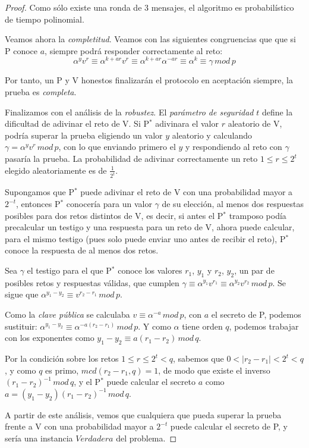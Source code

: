 \begin{proof}
	Como sólo existe una ronda de 3 mensajes, el algoritmo es probabilístico de tiempo polinomial.
	
	
	Veamos ahora la \textit{completitud}. Veamos con las siguientes congruencias que que si P conoce $a$, siempre podrá responder correctamente al reto:
	\[
	\alpha^y v^r \equiv \alpha ^{k+ar} v^r \equiv \alpha^{k+ar} \alpha ^{-a r} \equiv \alpha ^k \equiv \gamma \, mod \, p
	\]
	
	Por tanto, un P y V honestos finalizarán el protocolo en aceptación siempre, la prueba es \textit{completa}.
	
	Finalizamos con el análisis de la \textit{robustez}. El \textit{parámetro de seguridad} $t$ define la dificultad de adivinar el reto de V. Si P$^*$ adivinara el valor $r$ aleatorio de V, podría superar la prueba eligiendo un valor $y$ aleatorio y calculando $\gamma = \alpha ^y v ^r \, mod \, p$, con lo que enviando primero el $y$ y respondiendo al reto con $\gamma$ pasaría la prueba. La probabilidad de adivinar correctamente un reto $1\leq r\leq 2^t$ elegido aleatoriamente es de $\frac{1}{2^t}$.
	
	
	Supongamos que P$^*$ puede adivinar el reto de V con una probabilidad mayor a $2^{-t}$, entonces P$^*$ conocería para un valor $\gamma$ de su elección, al menos dos respuestas posibles para dos retos distintos de V, es decir, si antes el P$^*$ tramposo podía precalcular un testigo y una respuesta para un reto de V, ahora puede calcular, para el mismo testigo (pues solo puede enviar uno antes de recibir el reto), P$^*$ conoce la respuesta de al menos dos retos.
	
	Sea $\gamma$ el testigo para el que P$^*$ conoce los valores $r_1$, $y_1$ y $r_2$, $y_2$, un par de posibles retos y respuestas válidas, que cumplen $\gamma \equiv \alpha^{y_1} v^{r_1} \equiv \alpha^{y_2} v^{r_2} \, mod \, p$. Se sigue que $\alpha^{y_1 - y_2} \equiv v ^{r_2 - r_1}  \, mod \, p$.
		
	Como la \textit{clave pública} se calculaba $v\equiv \alpha^{-a} \, mod \, p$, con $a$ el secreto de P, podemos sustituir: $\alpha^{y_1 - y_2} \equiv \alpha ^{-a(r_2 - r_1)}  \, mod \, p$. Y como $\alpha$ tiene orden $q$, podemos trabajar con los exponentes como $y_1 - y_2 \equiv a(r_1 - r_2) \, mod \, q$.
	
	Por la condición sobre los retos $1\leq r \leq 2^t < q$, sabemos que $0 < \mid r_2 - r_1 \mid < 2^t < q$, y como $q$ es primo, $mcd(r_2-r_1,q)=1$, de modo que existe el inverso $(r_1 - r_2)^{-1} \, mod \, q$, y el P$^*$ puede calcular el secreto $a$ como $a = (y_1-y_2)(r_1-r_2)^{-1}\, mod \, q$.
	
	A partir de este análisis, vemos que cualquiera que pueda superar la prueba frente a V con una probabilidad mayor a $2^{-t}$ puede calcular el secreto de P, y sería una instancia $Verdadera$ del problema.
	
	
	
\end{proof}





